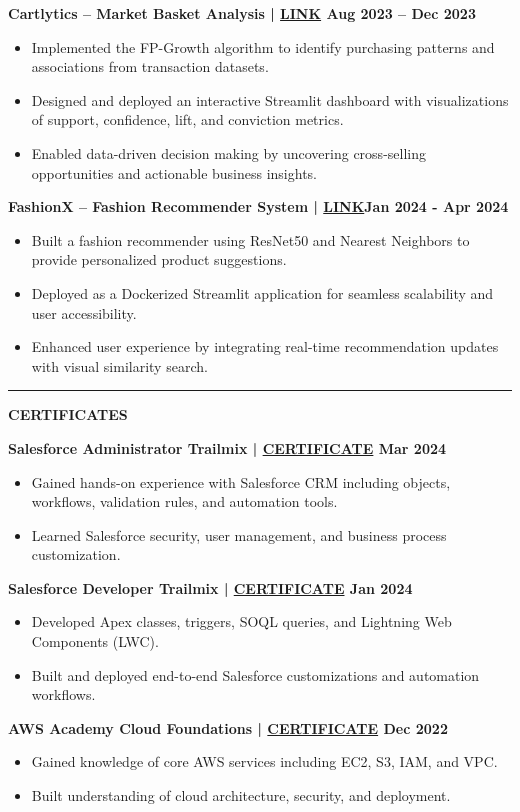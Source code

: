 \documentclass[11pt,a4paper]{article}
\newcommand{\link}[1]{\href{#1}{LINK}}
\newcommand{\certificate}[1]{\href{#1}{CERTIFICATE}}
\newcommand{\resumesection}[1]{
	\vspace{0.2cm}
	\hrule
	\vspace{0.2cm}
	\centerline{\large\textbf{#1}}
	\vspace{0.15cm}
}
\begin{document}
	\noindent \textbf{Cartlytics – Market Basket Analysis | \link{https://github.com/ValupadasuSaiabbhiram/Cartlytics} \hfill{Aug 2023 -- Dec 2023}}
	\begin{itemize}
		\item Implemented the FP-Growth algorithm to identify purchasing patterns and associations from transaction datasets.
		\item Designed and deployed an interactive Streamlit dashboard with visualizations of support, confidence, lift, and conviction metrics.
		\item Enabled data-driven decision making by uncovering cross-selling opportunities and actionable business insights.
	\end{itemize}
	\vspace{0.1cm}
	\noindent \textbf{FashionX – Fashion Recommender System | \link{https://github.com/ValupadasuSaiAbbhiram/FashionX}\hfill{Jan 2024 - Apr 2024}} 
	\begin{itemize}
		\item Built a fashion recommender using ResNet50 and Nearest Neighbors to provide personalized product suggestions.
		\item Deployed as a Dockerized Streamlit application for seamless scalability and user accessibility.
		\item Enhanced user experience by integrating real-time recommendation updates with visual similarity search.
	\end{itemize}
	
	\resumesection{CERTIFICATES}
		\noindent \textbf{Salesforce Administrator Trailmix | \certificate{https://www.salesforce.com/trailblazer/svalupadasu} \hfill{Mar 2024}}
		\begin{itemize}
			\item Gained hands-on experience with Salesforce CRM including objects, workflows, validation rules, and automation tools.
			\item Learned Salesforce security, user management, and business process customization.
		\end{itemize}
		
		\noindent \textbf{Salesforce Developer Trailmix | \certificate{https://www.salesforce.com/trailblazer/svalupadasu} \hfill{Jan 2024}}
		\begin{itemize}
			\item Developed Apex classes, triggers, SOQL queries, and Lightning Web Components (LWC).
			\item Built and deployed end-to-end Salesforce customizations and automation workflows.
		\end{itemize}
		
		\noindent \textbf{AWS Academy Cloud Foundations | \certificate{https://github.com/ValupadasuSaiabbhiram/Certificates/blob/main/AWS_Academy_Graduate___AWS_Academy_Cloud_Foundations_Badge20230729-28-vxr2h0.pdf} \hfill{Dec 2022}} 
		\begin{itemize}
			\item Gained knowledge of core AWS services including EC2, S3, IAM, and VPC.
			\item Built understanding of cloud architecture, security, and deployment.
		\end{itemize}
	
	
\end{document}
